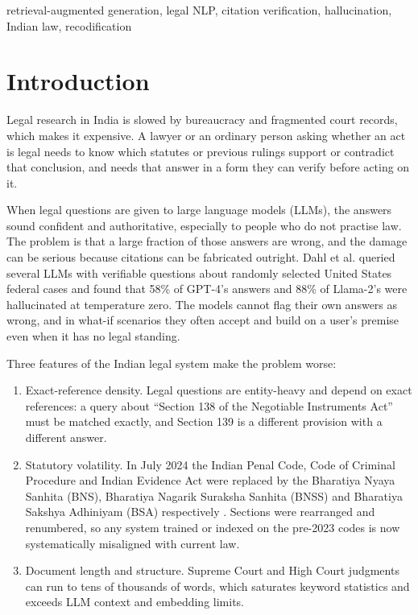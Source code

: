 \documentclass[conference]{IEEEtran}
\begin{document}
\begin{IEEEkeywords}
retrieval-augmented generation, legal NLP, citation verification, hallucination, Indian law, recodification
\end{IEEEkeywords}

\section{Introduction}

Legal research in India is slowed by bureaucracy and fragmented court records, which makes it expensive. A lawyer or an ordinary person asking whether an act is legal needs to know which statutes or previous rulings support or contradict that conclusion, and needs that answer in a form they can verify before acting on it.

When legal questions are given to large language models (LLMs), the answers sound confident and authoritative, especially to people who do not practise law. The problem is that a large fraction of those answers are wrong, and the damage can be serious because citations can be fabricated outright. Dahl et al. \cite{dahl2024} queried several LLMs with verifiable questions about randomly selected United States federal cases and found that 58\% of GPT-4's answers and 88\% of Llama-2's were hallucinated at temperature zero. The models cannot flag their own answers as wrong, and in what-if scenarios they often accept and build on a user's premise even when it has no legal standing.

Three features of the Indian legal system make the problem worse:

\begin{enumerate}
\item Exact-reference density. Legal questions are entity-heavy and depend on exact references: a query about ``Section 138 of the Negotiable Instruments Act'' must be matched exactly, and Section 139 is a different provision with a different answer.
\item Statutory volatility. In July 2024 the Indian Penal Code, Code of Criminal Procedure and Indian Evidence Act were replaced by the Bharatiya Nyaya Sanhita (BNS), Bharatiya Nagarik Suraksha Sanhita (BNSS) and Bharatiya Sakshya Adhiniyam (BSA) respectively \cite{dixit2025}. Sections were rearranged and renumbered, so any system trained or indexed on the pre-2023 codes is now systematically misaligned with current law.
\item Document length and structure. Supreme Court and High Court judgments can run to tens of thousands of words, which saturates keyword statistics and exceeds LLM context and embedding limits.
\end{enumerate}
\end{document}

